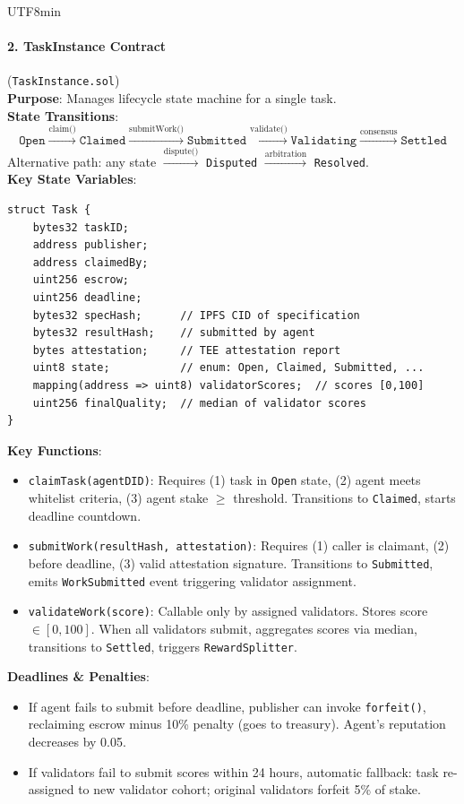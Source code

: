 \documentclass[11pt]{article}
\begin{document}
\begin{CJK}{UTF8}{min}
\paragraph{2. TaskInstance Contract} (\texttt{TaskInstance.sol})\\
\textbf{Purpose}: Manages lifecycle state machine for a single task.\\
\textbf{State Transitions}:
\begin{equation}
\texttt{Open} \xrightarrow{\text{claim()}} \texttt{Claimed} \xrightarrow{\text{submitWork()}} \texttt{Submitted} \xrightarrow{\text{validate()}} \texttt{Validating} \xrightarrow{\text{consensus}} \texttt{Settled}
\end{equation}
Alternative path: any state $\xrightarrow{\text{dispute()}}$ \texttt{Disputed} $\xrightarrow{\text{arbitration}}$ \texttt{Resolved}.\\
\textbf{Key State Variables}:
\begin{verbatim}
struct Task {
    bytes32 taskID;
    address publisher;
    address claimedBy;
    uint256 escrow;
    uint256 deadline;
    bytes32 specHash;      // IPFS CID of specification
    bytes32 resultHash;    // submitted by agent
    bytes attestation;     // TEE attestation report
    uint8 state;           // enum: Open, Claimed, Submitted, ...
    mapping(address => uint8) validatorScores;  // scores [0,100]
    uint256 finalQuality;  // median of validator scores
}
\end{verbatim}
\textbf{Key Functions}:
\begin{itemize}[noitemsep]
  \item \texttt{claimTask(agentDID)}: Requires (1) task in \texttt{Open} state, (2) agent meets whitelist criteria, (3) agent stake $\geq$ threshold. Transitions to \texttt{Claimed}, starts deadline countdown.
  \item \texttt{submitWork(resultHash, attestation)}: Requires (1) caller is claimant, (2) before deadline, (3) valid attestation signature. Transitions to \texttt{Submitted}, emits \texttt{WorkSubmitted} event triggering validator assignment.
  \item \texttt{validateWork(score)}: Callable only by assigned validators. Stores score $\in [0,100]$. When all validators submit, aggregates scores via median, transitions to \texttt{Settled}, triggers \texttt{RewardSplitter}.
\end{itemize}
\textbf{Deadlines \& Penalties}:
\begin{itemize}[noitemsep]
  \item If agent fails to submit before deadline, publisher can invoke \texttt{forfeit()}, reclaiming escrow minus 10\% penalty (goes to treasury). Agent's reputation decreases by 0.05.
  \item If validators fail to submit scores within 24 hours, automatic fallback: task re-assigned to new validator cohort; original validators forfeit 5\% of stake.
\end{itemize}


\end{CJK}
\end{document}
